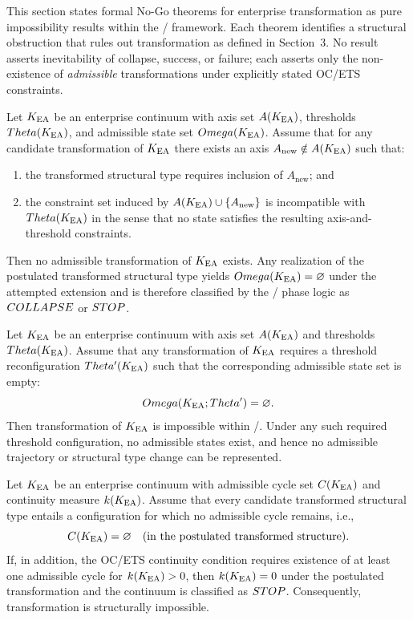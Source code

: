 ﻿%

This section states formal No-Go theorems for enterprise transformation as
pure impossibility results within the \OC/ framework. Each
theorem identifies a structural obstruction that rules out transformation as
defined in Section~3. No result asserts inevitability of collapse, success, or
failure; each asserts only the non-existence of \emph{admissible}
transformations under explicitly stated OC/ETS constraints.

\begin{theorem}
\label{thm:axis-incompatibility}
Let $K_{\mathrm{EA}}$ be an enterprise continuum with axis set $A(K_{\mathrm{EA}})$, thresholds
$Theta(K_{\mathrm{EA}})$, and admissible state set $Omega(K_{\mathrm{EA}})$. Assume that for any candidate
transformation of $K_{\mathrm{EA}}$ there exists an axis
$A_{\mathrm{new}} \notin A(K_{\mathrm{EA}})$ such that:
\begin{enumerate}
  \item the transformed structural type requires inclusion of
  $A_{\mathrm{new}}$; and
  \item the constraint set induced by $A(K_{\mathrm{EA}})\cup\{A_{\mathrm{new}}\}$ is
  incompatible with $Theta(K_{\mathrm{EA}})$ in the sense that no state satisfies the
  resulting axis-and-threshold constraints.
\end{enumerate}
Then no admissible transformation of $K_{\mathrm{EA}}$ exists. Any realization of the
postulated transformed structural type yields
$Omega(K_{\mathrm{EA}})=\varnothing$ under the attempted extension and is therefore classified
by the \OC/ phase logic as $COLLAPSE$ or $STOP$.
\end{theorem}

\begin{theorem}
\label{thm:threshold-barrier}
Let $K_{\mathrm{EA}}$ be an enterprise continuum with axis set $A(K_{\mathrm{EA}})$ and thresholds
$Theta(K_{\mathrm{EA}})$. Assume that any transformation of $K_{\mathrm{EA}}$ requires a threshold
reconfiguration $Theta'(K_{\mathrm{EA}})$ such that the corresponding admissible state set is
empty:
\[
Omega(K_{\mathrm{EA}};Theta')=\varnothing .
\]
Then transformation of $K_{\mathrm{EA}}$ is impossible within \OC/. Under any such
required threshold configuration, no admissible states exist, and hence no
admissible trajectory or structural type change can be represented.
\end{theorem}

\begin{theorem}
\label{thm:cycle-closure}
Let $K_{\mathrm{EA}}$ be an enterprise continuum with admissible cycle set $C(K_{\mathrm{EA}})$ and
continuity measure $k(K_{\mathrm{EA}})$. Assume that every candidate transformed
structural type entails a configuration for which no admissible cycle remains,
i.e.,
\[
C(K_{\mathrm{EA}})=\varnothing
\quad\text{(in the postulated transformed structure).}
\]
If, in addition, the OC/ETS continuity condition requires existence of at least
one admissible cycle for $k(K_{\mathrm{EA}})>0$, then $k(K_{\mathrm{EA}})=0$ under the
postulated transformation and the continuum is classified as $STOP$.
Consequently, transformation is structurally impossible.
\end{theorem}

